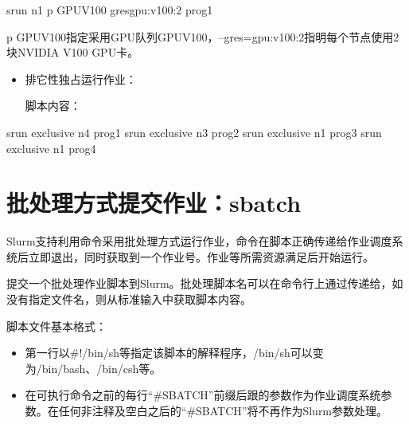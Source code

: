 \documentclass[a4paper,12pt,english]{sphinxmanual}
\begin{document}
\begin{sphinxVerbatim}[commandchars=\\\{\}]
srun \PYGZhy{}n1 \PYGZhy{}p GPU\PYGZhy{}V100 \PYGZhy{}\PYGZhy{}gresgpu:v100:2 prog1 
\end{sphinxVerbatim}

\sphinxAtStartPar
\sphinxhyphen{}p GPU\sphinxhyphen{}V100指定采用GPU队列GPU\sphinxhyphen{}V100，–gres=gpu:v100:2指明每个节点使用2块NVIDIA V100 GPU卡。
\begin{itemize}
\item {} 
\sphinxAtStartPar
排它性独占运行作业：

\sphinxAtStartPar
脚本内容：

\end{itemize}

\begin{sphinxVerbatim}[commandchars=\\\{\}]
srun \PYGZhy{}\PYGZhy{}exclusive \PYGZhy{}n4 prog1 
srun \PYGZhy{}\PYGZhy{}exclusive \PYGZhy{}n3 prog2 
srun \PYGZhy{}\PYGZhy{}exclusive \PYGZhy{}n1 prog3 
srun \PYGZhy{}\PYGZhy{}exclusive \PYGZhy{}n1 prog4 
\end{sphinxVerbatim}


\section{批处理方式提交作业：sbatch}
\label{\detokenize{slurm/slurm:sbatch}}
\sphinxAtStartPar
Slurm支持利用命令采用批处理方式运行作业，命令在脚本正确传递给作业调度系统后立即退出，同时获取到一个作业号。作业等所需资源满足后开始运行。

\sphinxAtStartPar
{}提交一个批处理作业脚本到Slurm。批处理脚本名可以在命令行上通过传递给，如没有指定文件名，则从标准输入中获取脚本内容。

\sphinxAtStartPar
脚本文件基本格式：
\begin{itemize}
\item {} 
\sphinxAtStartPar
第一行以\#!/bin/sh等指定该脚本的解释程序，/bin/sh可以变为/bin/bash、/bin/csh等。

\item {} 
\sphinxAtStartPar
在可执行命令之前的每行“\#SBATCH”前缀后跟的参数作为作业调度系统参数。在任何非注释及空白之后的“\#SBATCH”将不再作为Slurm参数处理。

\end{itemize}
\end{document}

